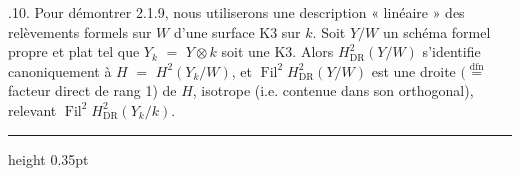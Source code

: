 \documentclass[9pt]{article}
\newcommand{\CanonText}[1]{\par{\fontsize{8.0}{9.35}\selectfont\RaggedRight #1\par}\vspace{2.2pt}}
\begin{document}
\begin{minipage}[t][\dimexpr\textheight-5pt\relax][t]{\textwidth}
\CanonText{2.1.10. Pour démontrer 2.1.9, nous utiliserons une description « linéaire » des relèvements formels sur \(W\) d'une surface K3 sur \(k\). Soit \(Y/W\) un schéma formel propre et plat tel que \(Y_{k}\) \(=\) \(Y\otimes{}k\) soit une K3. Alors \(H^{2}_{\mathrm{DR}}(Y/W)\) s'identifie canoniquement à \(H\) \(=\) \(H^{2}(Y_{k}/W)\), et \(\operatorname{Fil}^{2}H^{2}_{\mathrm{DR}}(Y/W)\) est une droite \((\overset{\mathrm{dfn}}{=}\) facteur direct de rang 1) de \(H\), isotrope (i.e. contenue dans son orthogonal), relevant \(\operatorname{Fil}^{2}H^{2}_{\mathrm{DR}}(Y_{k}/k)\).}
\vfill
{\color{Accent}\hrule height 0.35pt}\vspace{3pt}
\end{minipage}
\newpage
\end{document}
